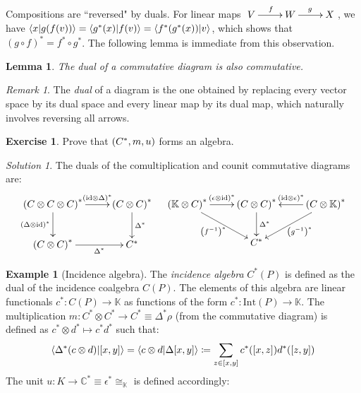 \documentclass{article}
\newtheorem{Lemma}{Lemma}
\theoremstyle{definition}
\newtheorem*{Example*}{Example}
\newtheorem{Exercise}{Exercise}
\theoremstyle{remark}
\newtheorem*{Remark*}{Remark}
\newtheorem*{Solution*}{Solution}
\theoremstyle{underline}
\theoremstyle{underline}
\newcommand{\id}{\mathrm{id}}
\begin{document}
 	Compositions are ``reversed" by duals. For linear maps $\xymatrix{V \ar[r]^f & W \ar[r]^g & X}$, we have $\braket{x}{g(f(v))} = \braket{g^*(x)}{f(v)} = \braket{f^*(g^*(x))}{v}$, which shows that $(g \circ f)^* = f^* \circ g^*$. The following lemma is immediate from this observation.

 	\begin{Lemma}
 		The dual of a commutative diagram is also commutative.
 	\end{Lemma}
 
 	\begin{Remark*}
 		The \emph{dual} of a diagram is the one obtained by replacing every vector space by its dual space and every linear map by its dual map, which naturally involves reversing all arrows.
 	\end{Remark*}
 	
 	\begin{Exercise}
 		Prove that $\pqty{C^*, m, u}$ forms an algebra.
 	\end{Exercise}
 	\begin{Solution*}
 		The duals of the comultiplication and counit commutative diagrams are:
 		\begin{align*}
		\xymatrix{
			\pqty{C \otimes C \otimes C}^* \ar[r]^-{\pqty{\id \otimes \Delta}^*} \ar[d]_{\pqty{\Delta \otimes \id}^*} & \pqty{C \otimes C}^*   \ar[d]^-{\Delta^*} \\
			\pqty{C \otimes C}^* \ar[r]_-{\Delta^*} & C^*
		} & &
		\xymatrix{
			\pqty{\mathbb K \otimes C}^* \ar[r]^-{\pqty{\epsilon \otimes \id}^*} \ar[rd]_{\pqty{f^{-1}}^*} & \pqty{C \otimes C}^* \ar[d]^{\Delta^*} & \pqty{C \otimes \mathbb K}^* \ar[l]_-{\pqty{\id \otimes \epsilon}^*} \ar[ld]^{\pqty{g^{-1}}^*} \\
			& C^* &	
		}
		\end{align*}
 	\end{Solution*}

 	\begin{Example*}[Incidence algebra]
 		The \emph{incidence algebra} $C^*(P)$ is defined as the dual of the incidence coalgebra $C(P)$. The elements of this algebra are linear functionals $c^* \colon C(P) \to \mathbb K$ as functions of the form $c^* \colon \mathrm{Int}(P) \to \mathbb K$. The multiplication $m \colon C^* \otimes C^* \to C^* \equiv \Delta^* \rho$ (from the commutative diagram) is defined as $c^* \otimes d^* \mapsto c^* d^*$ such that:
 		\begin{gather*}
 			\braket{\Delta^*\pqty{c \otimes d}}{[x,y]} = \braket{c \otimes d}{\Delta[x,y]} \coloneqq \sum_{z \in [x,y]} c^*\pqty{[x,z]}d^*\pqty{[z,y]}
 		\end{gather*}
 		The unit $u \colon K \to \mathbb C^* \equiv \epsilon^* \cong_{\mathbb K}$ is defined accordingly:

 	\end{Example*}
	
\end{document}

